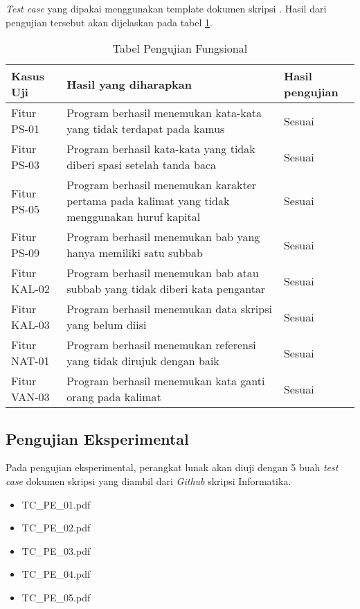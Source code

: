 \textit{Test case} yang dipakai menggunakan template dokumen skripsi . Hasil dari pengujian tersebut akan dijelaskan pada tabel \ref{tab:pengujian_fungsional}.

\begin{table}[H]
	\renewcommand{\arraystretch}{1.5}
	\caption {Tabel Pengujian Fungsional} 	
	\label{tab:pengujian_fungsional}
	\begin{center}
		\begin{tabular}{|p{2.5 cm}|>{\raggedright} p{6.0 cm}| p{6.0 cm}|}
		\hline
		Kasus Uji & Hasil yang diharapkan & Hasil pengujian \\ 
		\hline
		Fitur PS-01 & Program berhasil menemukan kata-kata yang tidak terdapat pada kamus & Sesuai \\ 
		\hline
		Fitur PS-03 & Program berhasil kata-kata yang tidak diberi spasi setelah tanda baca & Sesuai \\ 
		\hline 
		Fitur PS-05 & Program berhasil menemukan karakter pertama pada kalimat yang tidak menggunakan huruf kapital & Sesuai \\ 
		\hline 
		Fitur PS-09 & Program berhasil menemukan bab yang hanya memiliki satu subbab & Sesuai \\ 
		\hline
		Fitur KAL-02 & Program berhasil menemukan bab atau subbab yang tidak diberi kata pengantar & Sesuai \\
		\hline
		Fitur KAL-03 & Program berhasil menemukan data skripsi yang belum diisi  & Sesuai \\
		\hline
		Fitur NAT-01 & Program berhasil menemukan referensi yang tidak dirujuk dengan baik & Sesuai \\
		\hline
		Fitur VAN-03 & Program berhasil menemukan kata ganti orang pada kalimat & Sesuai \\ 
		\hline
		\end{tabular}
	\end{center}
\end{table}

\subsection{Pengujian Eksperimental}
Pada pengujian eksperimental, perangkat lunak akan diuji dengan 5 buah \textit{test case} dokumen skripsi yang diambil dari \textit{Github} skripsi Informatika.

\begin{itemize}
	\item TC\_PE\_01.pdf~\cite{pe01}
	\item TC\_PE\_02.pdf~\cite{pe02}
	\item TC\_PE\_03.pdf~\cite{pe03}
	\item TC\_PE\_04.pdf~\cite{pe04}
	\item TC\_PE\_05.pdf~\cite{pe05}
\end{itemize}
